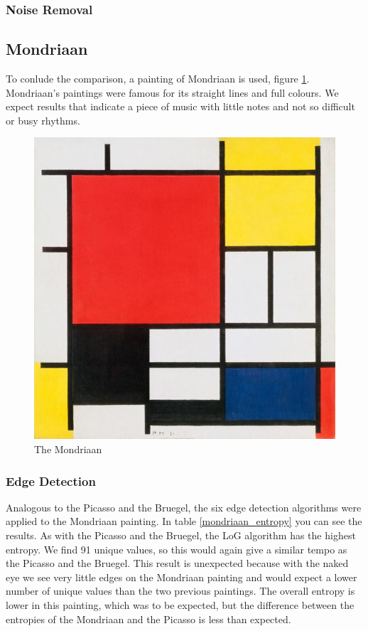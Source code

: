 \documentclass[12pt]{article}
\begin{document}
\subsubsection{Noise Removal}

\subsection{Mondriaan}

To conlude the comparison, a painting of Mondriaan is used, figure \ref{mondriaan}. Mondriaan's paintings were famous for its straight lines and full colours. We expect results that indicate a piece of music with little notes and not so difficult or busy rhythms.

\begin{figure}[h]
\centering
\includegraphics[scale = 0.6]{img/mondriaan}
\caption{The Mondriaan}
\label{mondriaan}
\end{figure}

\subsubsection{Edge Detection}

Analogous to the Picasso and the Bruegel, the six edge detection algorithms were applied to the Mondriaan painting. In table \ref{mondriaan_entropy} you can see the results. As with the Picasso and the Bruegel, the LoG algorithm has the highest entropy. We find 91 unique values, so this would again give a similar tempo as the Picasso and the Bruegel. This result is unexpected because with the naked eye we see very little edges on the Mondriaan painting and would expect a lower number of unique values than the two previous paintings. The overall entropy is lower in this painting, which was to be expected, but the difference between the entropies of the Mondriaan and the Picasso is less than expected.
\end{document}
